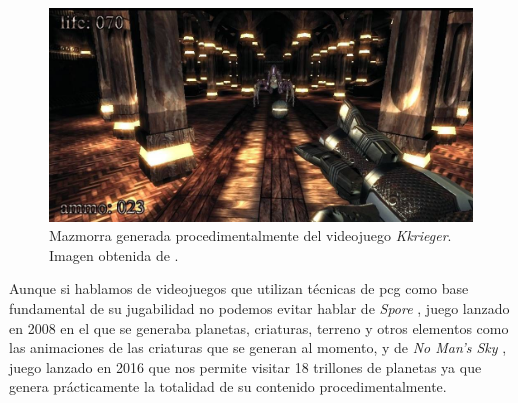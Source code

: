 \begin{figure}[H]
    \begin{center}
        \includegraphics[scale=0.3]{img/kkrieger.jpg}
        \caption{Mazmorra generada procedimentalmente del videojuego \textit{Kkrieger}. Imagen obtenida de \cite{chirinea}.}
    \end{center}
\end{figure}

Aunque si hablamos de videojuegos que utilizan técnicas de \acrshort{pcg} como base fundamental de su jugabilidad no podemos evitar hablar de \textit{Spore} \cite{spore}, juego lanzado en 2008 en el que se generaba planetas, criaturas, terreno y otros elementos como las animaciones de las criaturas que se generan al momento, y de \textit{No Man's Sky} \cite{nomansky}, juego lanzado en 2016 que nos permite visitar 18 trillones de planetas ya que genera prácticamente la totalidad de su contenido procedimentalmente.

